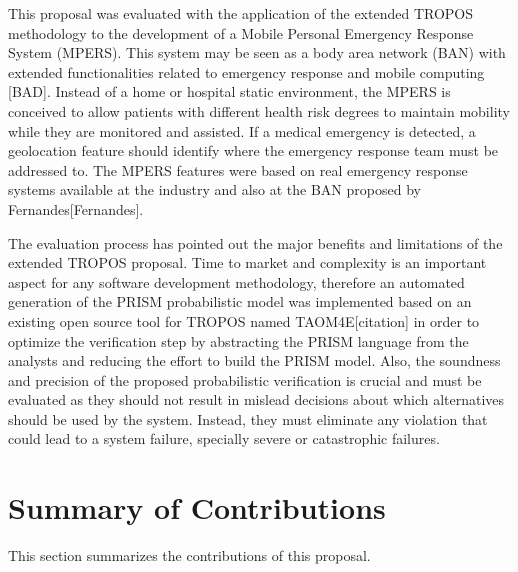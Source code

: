 This proposal was evaluated with the application of the extended TROPOS methodology to the development of a Mobile Personal Emergency Response System (MPERS). This system may be seen as a body area network (BAN) with extended functionalities related to emergency response and mobile computing [BAD]. Instead of a home or hospital static environment, the MPERS is conceived to allow patients with different health risk degrees to maintain mobility while they are monitored and assisted. If a medical emergency is detected, a geolocation feature should identify where the emergency response team must be addressed to. The MPERS features were based on real emergency response systems available at the industry and also at the BAN proposed by Fernandes[Fernandes].

The evaluation process has pointed out the major benefits and limitations of the extended TROPOS proposal. Time to market and complexity is an important aspect for any software development methodology, therefore an automated generation of the PRISM probabilistic model was implemented based on an existing open source tool for TROPOS named TAOM4E[citation] in order to optimize the verification step by abstracting the PRISM language from the analysts and reducing the effort to build the PRISM model.  Also, the soundness and precision of the proposed probabilistic verification is crucial and must be evaluated as they should not result in mislead decisions about which alternatives should be used by the system. Instead, they must eliminate any violation that could lead to a system failure, specially severe or catastrophic failures.


\section{Summary of Contributions}

This section summarizes the contributions of this proposal.


